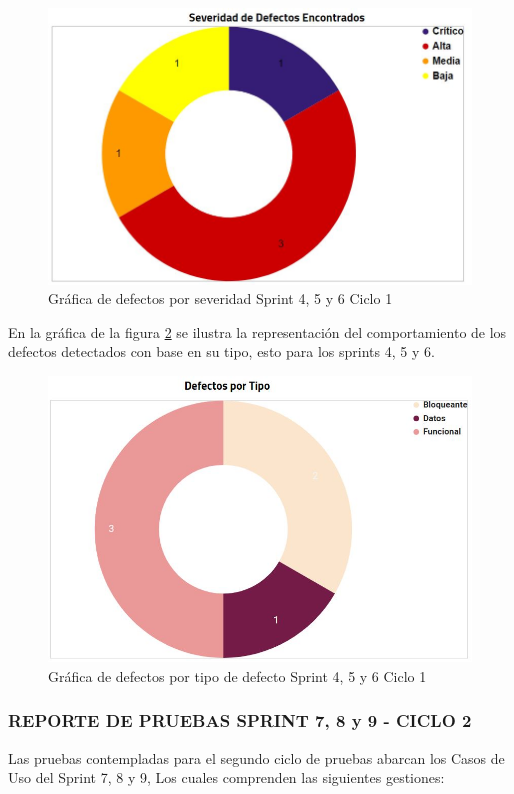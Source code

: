 \begin{figure}[H]
	\begin{center}
		\includegraphics[width=.65\textwidth]{images/pruebas/s4c2-1}
		\caption{Gráfica de defectos por severidad Sprint 4, 5 y 6  Ciclo 1}
		\label{fig:infos4c2-1}
	\end{center}
\end{figure}

En la gráfica de la figura \ref{fig:infos4c2-2} se ilustra la representación del comportamiento de los defectos detectados con base en su tipo, esto para los sprints 4, 5 y 6.

\begin{figure}[H]
	\begin{center}
		\includegraphics[width=.65\textwidth]{images/pruebas/s4c2-2}
		\caption{Gráfica de defectos por tipo de defecto Sprint 4, 5 y 6  Ciclo 1}
		\label{fig:infos4c2-2}
	\end{center}
\end{figure}

\subsubsection{REPORTE DE PRUEBAS SPRINT 7, 8 y 9 - CICLO 2}

Las pruebas contempladas para el segundo ciclo de pruebas abarcan los Casos de Uso del Sprint 7, 8 y 9, Los cuales comprenden las siguientes gestiones:

